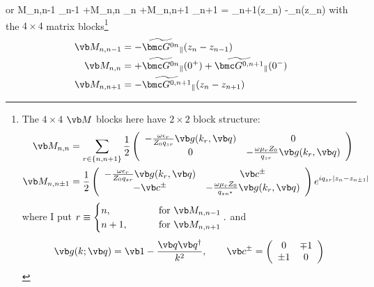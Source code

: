 \documentclass[letterpaper]{article}
\renewcommand{\wt}{\widetilde}
\begin{document}
or
{
  \vb M_{n,n-1}  \cdot \wt{\bmc S}_{n-1}
 +\vb M_{n,n}    \cdot \wt{\bmc S}_{n}
 +\vb M_{n,n+1}  \cdot \wt{\bmc S}_{n+1}
 =  \wt{\bmc F}_{n+1\parallel}(z_n)
   -\wt{\bmc F}_{n\parallel}(z_n)
}
with the $4\times 4$ matrix blocks\footnote{The $4\times 4$ $\vb M$
blocks here have $2\times 2$ block structure:
\begin{align}
 \vb M_{n, n}
   &= \sum_{r\in \{n, n+1\}}
     \frac{1}{2}
     \left(\begin{array}{cc}
     -\frac{\omega\epsilon_r}{Z_0 q_{zr}}\vb g(k_r, \vb q)
   & 0
 \\
     0
   & -\frac{\omega\mu_r Z_0 }{q_{zr}}\vb g(k_r, \vb q)
   \end{array}\right)
\\
 \vb M_{n, n \pm 1}
   &= \frac{1}{2}
     \left(\begin{array}{cc}
     -\frac{\omega\epsilon_r}{Z_0 q_{zr}}\vb g(k_r, \vb q)
   & \vb c^\pm
 \\
     -\vb  c^\pm
   & -\frac{\omega\mu_r Z_0 }{q_{zn^*}}\vb g(k_r, \vb q)
     \end{array}\right)e^{iq_{zr}|z_n-z_{n\pm 1}|}
\end{align}
where I put
$  r \equiv  \begin{cases} n,   \qquad &\text{ for } \vb M_{n,n-1} \\
                           n+1, \qquad &\text{ for } \vb M_{n,n+1}
              \end{cases}.
$
and 
$$ \vb g(k; \vb q) =
   \vb 1 - \frac{\vb q\vb q^\dagger}{k^2},
   \qquad 
   \vb c^\pm
   =\left(\begin{array}{cc} 0 & \mp 1 \\ \pm 1 & 0 \end{array}\right)
$$}
\begin{subequations}
\begin{align}
  \vb M_{n,n-1} &= -\wt{\bmc G^{0n}}_{\parallel}(z_n-z_{n-1}) 
\\
  \vb M_{n,n} &= +\wt{\bmc G^{0n}}_{\parallel}(0^+)
                 +\wt{\bmc G^{0,n+1}}_{\parallel}(0^-)
\\
  \vb M_{n,n+1} &= -\wt{\bmc G^{0,n+1}}_{\parallel}(z_n-z_{n+1}) 
\end{align}
\label{MChunks}
\end{subequations}
\end{document}
